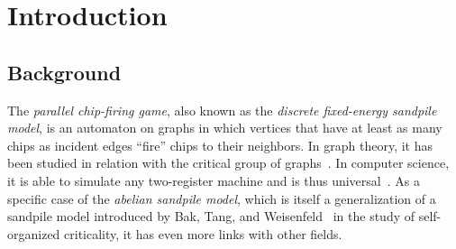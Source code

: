 \section{Introduction}

\subsection*{Background}
The \emph{parallel chip-firing game}, also known as the \emph{discrete
  fixed-energy sandpile model}, is an automaton on graphs in which vertices
that have at least as many chips as incident edges ``fire'' chips to their
neighbors. In graph theory, it has been studied in relation with the critical
group of graphs~\cite{biggs}. In computer science, it is able to simulate any
two-register machine and is thus universal~\cite{universality}. As a specific
case of the \emph{abelian sandpile model}, which is itself a generalization of
a sandpile model introduced by Bak, Tang, and Weisenfeld~\cite{BTWcriticality,
  BTWmoreCriticality} in the study of self-organized criticality, it has even
more links with other fields.

